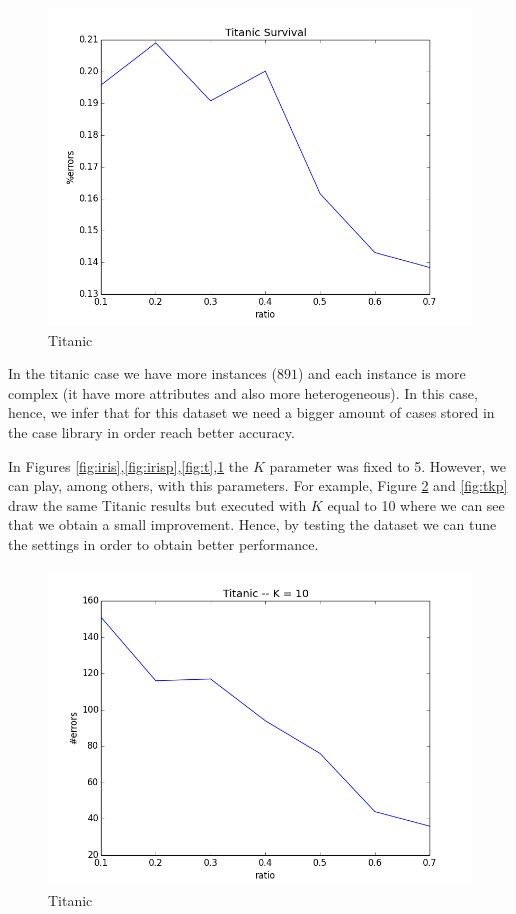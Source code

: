 \documentclass[11pt]{article}
\begin{document}
\begin{figure}[htb]
    \center
    \includegraphics[width=0.7\linewidth]{images/titanic_p_bo}
    \caption{Titanic}
    \label{fig:tp}
\end{figure}

In the titanic case we have more instances ($891$) and each instance is more complex (it have more attributes and also more heterogeneous). In this case, hence, we infer that for this dataset we need a bigger amount of cases stored in the case library in order reach better accuracy.

In Figures \ref{fig:iris},\ref{fig:irisp},\ref{fig:t},\ref{fig:tp} the $K$ parameter was fixed to 5. However, we can play, among others, with this parameters. For example, Figure \ref{fig:tk} and \ref{fig:tkp} draw the same Titanic results but executed with $K$ equal to 10 where we can see that we obtain a small improvement. Hence, by testing the dataset we can tune the settings in order to obtain better performance.


\begin{figure}[htb]
    \center
    \includegraphics[width=0.7\linewidth]{images/tk10}
    \caption{Titanic}
    \label{fig:tk}
\end{figure}
\end{document}
